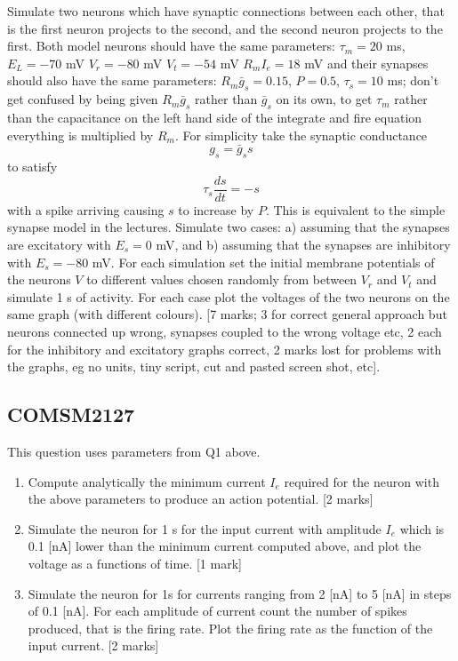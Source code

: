 \documentclass[12pt]{article}
\begin{document}
Simulate two neurons which have synaptic connections between
  each other, that is the first neuron projects to the second, and the
  second neuron projects to the first. Both model neurons should have
  the same parameters: $\tau_m = 20$ ms, $E_L = -70$ mV $V_r = -80$ mV
  $V_t = -54$ mV $R_mI_e = 18$ mV and their synapses should also have
  the same parameters: $R_m \bar{g}_s = 0.15$, $P = 0.5$, $\tau_s= 10$
  ms; don't get confused by being given $R_m\bar{g}_s$ rather than
  $\bar{g}_s$ on its own, to get $\tau_m$ rather than the capacitance
  on the left hand side of the integrate and fire equation everything
  is multiplied by $R_m$. For simplicity take the synaptic conductance
\begin{equation}
g_s=\bar{g}_s s
\end{equation}
to satisfy
\begin{equation}
\tau_s\frac{ds}{dt}=-s
\end{equation}
with a spike arriving causing $s$ to increase by $P$. This is
equivalent to the simple synapse model in the lectures. Simulate two
cases: a) assuming that the synapses are excitatory with $E_s = 0$ mV,
and b) assuming that the synapses are inhibitory with $E_s = -80$
mV. For each simulation set the initial membrane potentials of the
neurons $V$ to different values chosen randomly from between $V_r$ and
$V_t$ and simulate 1 s of activity. For each case plot the voltages of
the two neurons on the same graph (with different colours). [7 marks;
  3 for correct general approach but neurons connected up wrong,
  synapses coupled to the wrong voltage etc, 2 each for the inhibitory
  and excitatory graphs correct, 2 marks lost for problems with the
  graphs, eg no units, tiny script, cut and pasted screen shot, etc].

\subsection*{COMSM2127}

This question uses parameters from Q1 above.

\begin{enumerate}

\item Compute analytically the minimum current $I_e$ required for the
  neuron with the above parameters to produce an action
  potential. [2 marks]

\item Simulate the neuron for 1 s for the input current with amplitude
  $I_e$ which is 0.1 [nA] lower than the minimum current computed
  above, and plot the voltage as a functions of time. [1 mark]

\item Simulate the neuron for 1s for currents ranging from 2 [nA] to 5
  [nA] in steps of 0.1 [nA]. For each amplitude of current count the
  number of spikes produced, that is the firing rate. Plot the firing
  rate as the function of the input current. [2 marks]

\end{enumerate}
\end{document}
